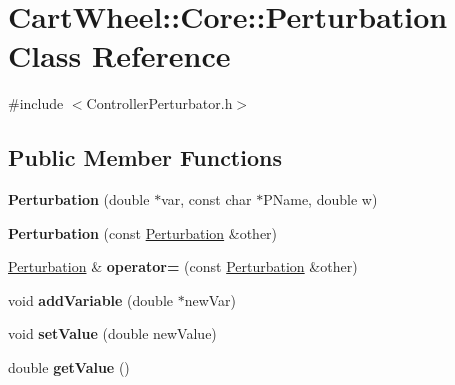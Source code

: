 \hypertarget{classCartWheel_1_1Core_1_1Perturbation}{
\section{CartWheel::Core::Perturbation Class Reference}
\label{classCartWheel_1_1Core_1_1Perturbation}
}


{\ttfamily \#include $<$ControllerPerturbator.h$>$}

\subsection*{Public Member Functions}
\begin{DoxyCompactItemize}
\item 
\hypertarget{classCartWheel_1_1Core_1_1Perturbation_ac618a55394b02c94b4620ddb8605f321}{
{\bfseries Perturbation} (double $\ast$var, const char $\ast$PName, double w)}
\label{classCartWheel_1_1Core_1_1Perturbation_ac618a55394b02c94b4620ddb8605f321}

\item 
\hypertarget{classCartWheel_1_1Core_1_1Perturbation_af4b0644b316f35d31388a0147e1f67bf}{
{\bfseries Perturbation} (const \hyperlink{classCartWheel_1_1Core_1_1Perturbation}{Perturbation} \&other)}
\label{classCartWheel_1_1Core_1_1Perturbation_af4b0644b316f35d31388a0147e1f67bf}

\item 
\hypertarget{classCartWheel_1_1Core_1_1Perturbation_a2582db956313929c9e8bc4b7709e3246}{
\hyperlink{classCartWheel_1_1Core_1_1Perturbation}{Perturbation} \& {\bfseries operator=} (const \hyperlink{classCartWheel_1_1Core_1_1Perturbation}{Perturbation} \&other)}
\label{classCartWheel_1_1Core_1_1Perturbation_a2582db956313929c9e8bc4b7709e3246}

\item 
\hypertarget{classCartWheel_1_1Core_1_1Perturbation_ab7081851d89927451e168567011a4614}{
void {\bfseries addVariable} (double $\ast$newVar)}
\label{classCartWheel_1_1Core_1_1Perturbation_ab7081851d89927451e168567011a4614}

\item 
\hypertarget{classCartWheel_1_1Core_1_1Perturbation_ad4e836e5be0433067a94a5d918e56773}{
void {\bfseries setValue} (double newValue)}
\label{classCartWheel_1_1Core_1_1Perturbation_ad4e836e5be0433067a94a5d918e56773}

\item 
\hypertarget{classCartWheel_1_1Core_1_1Perturbation_ab21514ef7f2914988f0a4bb843b6b12b}{
double {\bfseries getValue} ()}
\label{classCartWheel_1_1Core_1_1Perturbation_ab21514ef7f2914988f0a4bb843b6b12b}


\end{DoxyCompactItemize}
